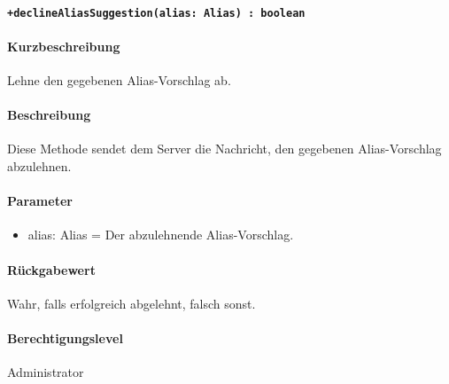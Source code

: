 \paragraph{\texttt{+declineAliasSuggestion(alias: Alias) : boolean}}%
\paragraph*{Kurzbeschreibung}
Lehne den gegebenen Alias-Vorschlag ab.
\paragraph*{Beschreibung}
Diese Methode sendet dem Server die Nachricht, den gegebenen Alias-Vorschlag abzulehnen.
\paragraph*{Parameter}
\begin{itemize}
    \item alias: Alias = Der abzulehnende Alias-Vorschlag.
\end{itemize}
\paragraph*{Rückgabewert}
Wahr, falls erfolgreich abgelehnt, falsch sonst.
\paragraph*{Berechtigungslevel}
Administrator
